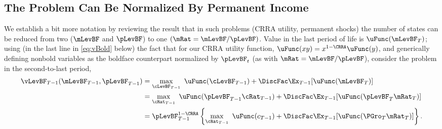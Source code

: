\documentclass[BufferStockTheory]{subfiles}
\begin{document}
\hypertarget{The-Problem-Can-Be-Rewritten-in-Ratio-Form}{}
\hypertarget{The-Problem-Can-Be-Normalized-By-Permanent-Income}{}
\subsection{The Problem Can Be Normalized By Permanent Income}

\label{subsec:ratio}

We establish a bit more notation by reviewing the result that in such problems (CRRA utility, permanent shocks) the number of states can be reduced from two ($\mLevBF$ and $\pLevBF$) to one $(\mRat = \mLevBF/\pLevBF)$.  Value in the last period of life is $\uFunc(\mLevBF_{T})$; using (in the last line in \eqref{eq:vBold} below) the fact that for our CRRA utility function, $\uFunc(xy) = x^{1-\CRRA}\uFunc(y)$, and generically defining nonbold variables as the boldface counterpart normalized by $\pLevBF_{t}$ (as with $\mRat=\mLevBF/\pLevBF$), consider the problem in the second-to-last period,
\begin{align}
  \vLevBF_{T-1}(\mLevBF_{T-1},\pLevBF_{T-1})  & = 
                                                \max_{\cLevBF_{T-1}}~ \uFunc(\cLevBF_{T-1}) +\DiscFac \Ex_{T-1} [ \uFunc(\mLevBF_{T})]
                                                \notag \\
                                              & =  \max_{\cRat_{T-1}}~
                                                \uFunc(\pLevBF_{T-1}\cRat_{T-1}) + \DiscFac  \Ex_{T-1} [\uFunc(\pLevBF_{T}{\mRat}
                                                _{T})]  \notag \\
                                              & = \pLevBF_{T-1}^{1-\CRRA}
                                                \left\{\max_{\cRat_{T-1}}~ \uFunc(c_{T-1}) + \DiscFac \Ex_{T-1} [ \uFunc( {\PGro}_{T}
                                                {\mRat}_{T}) ] \right\}.   \label{eq:vBold}
\end{align}
\end{document}
